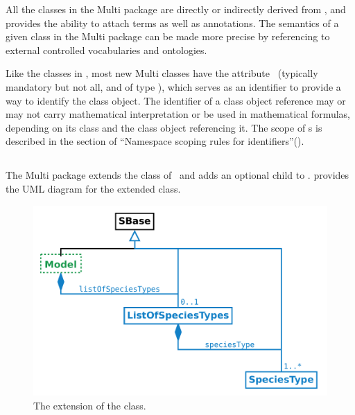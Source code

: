 All the classes in the Multi package are directly or indirectly derived from \SBase, and \SBase provides the ability to attach  terms as well as  annotations. The semantics of a given class in the Multi package can be made more precise by referencing to external controlled vocabularies and ontologies.

Like the classes in \SbmlLevelThreeCore, most new Multi classes have the attribute \idAtt\ (typically mandatory but not all, and of type \SIdPT), which serves as an identifier to provide a way to identify the class object. The identifier of a class object reference may or may not carry  mathematical interpretation or be used in mathematical formulas, depending on its class and the class object referencing it. The scope of \idAtt s is described in the section of ``Namespace scoping rules for identifiers''(). 

\clearpage

\subsection{\Model}
\label{def:Model}

The Multi package extends the \Model class of \SbmlLevelThreeCore\ and adds an optional \ListOfSpeciesTypes child to \ExModel.  provides the UML diagram for the extended \ExModel class.

\begin{figure}[htb]
  \begin{center}
    \includegraphics[scale=0.37]{./figs/multi_001_model.pdf}
    \caption{The extension of the \Model class.}
  \label{fig:Model}
  \end{center}
\end{figure}


